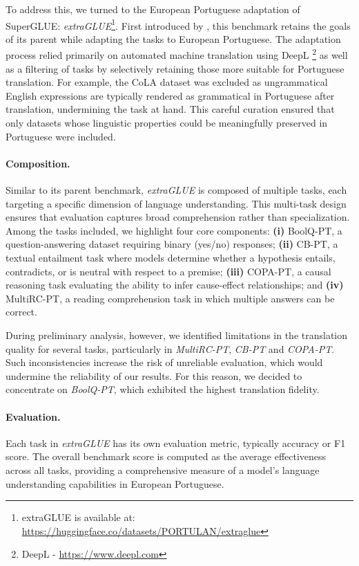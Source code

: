 To address this, we turned to the European Portuguese adaptation of SuperGLUE: \emph{extraGLUE}\footnote{extraGLUE is available at: \url{https://huggingface.co/datasets/PORTULAN/extraglue}}. First introduced by \citet{santos2024advancing}, this benchmark retains the goals of its parent while adapting the tasks to European Portuguese. The adaptation process relied primarily on automated machine translation using DeepL \footnote{DeepL - \url{https://www.deepl.com}} as well as a filtering of tasks by selectively retaining those more suitable for Portuguese translation. For example, the CoLA dataset was excluded as ungrammatical English expressions are typically rendered as grammatical in Portuguese after translation, undermining the task at hand. This careful curation ensured that only datasets whose linguistic properties could be meaningfully preserved in Portuguese were included. 


\paragraph{Composition.}
Similar to its parent benchmark, \emph{extraGLUE} is composed of multiple tasks, each targeting a specific dimension of language understanding. This multi-task design ensures that evaluation captures broad comprehension rather than specialization.
Among the tasks included, we highlight four core components: \textbf{(i)} BoolQ-PT, a question-answering dataset requiring binary (yes/no) responses; \textbf{(ii)} CB-PT, a textual entailment task where models determine whether a hypothesis entails, contradicts, or is neutral with respect to a premise; \textbf{(iii)} COPA-PT, a causal reasoning task evaluating the ability to infer cause-effect relationships; and \textbf{(iv)} MultiRC-PT, a reading comprehension task in which multiple answers can be correct.

During preliminary analysis, however, we identified limitations in the translation quality for several tasks, particularly in \textit{MultiRC-PT}, \textit{CB-PT} and \textit{COPA-PT}. Such inconsistencies increase the risk of unreliable evaluation, which would undermine the reliability of our results. For this reason, we decided to concentrate on \textit{BoolQ-PT}, which exhibited the highest translation fidelity.

\paragraph{Evaluation.}
Each task in \emph{extraGLUE} has its own evaluation metric, typically accuracy or F1 score. The overall benchmark score is computed as the average effectiveness across all tasks, providing a comprehensive measure of a model's language understanding capabilities in European Portuguese.


